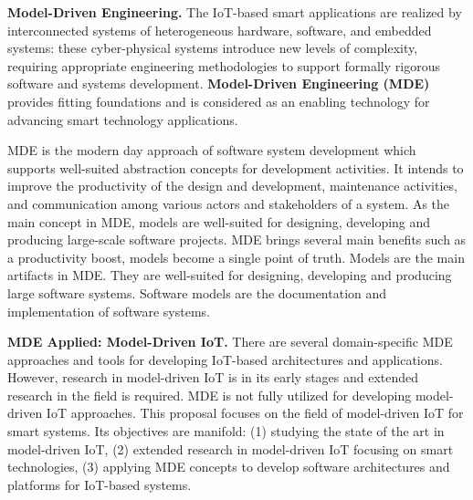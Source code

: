 \documentclass[10pt, oneside]{article}
\begin{document}
\textbf{Model-Driven Engineering.} The IoT-based smart applications are realized by interconnected systems of heterogeneous hardware, software, and embedded systems: these cyber-physical systems introduce new levels of complexity, requiring appropriate engineering methodologies to support formally rigorous software and systems development. \textbf{Model-Driven Engineering (MDE)} provides fitting foundations and is considered as an enabling technology for advancing smart technology applications.

MDE is the modern day approach of software system development which supports well-suited abstraction concepts for development activities. It intends to improve the productivity of the design and development, maintenance activities, and communication among various actors and stakeholders of a system. As the main concept in MDE, models are well-suited for designing, developing and producing large-scale software projects. MDE brings several main benefits such as a productivity boost, models become a single point of truth. Models are the main artifacts in MDE. They are well-suited for designing, developing and producing large software systems. Software models are the documentation and implementation of software systems.

\textbf{MDE Applied: Model-Driven IoT.} There are several domain-specific MDE approaches and tools for developing IoT-based architectures and applications. However, research in model-driven IoT is in its early stages and extended research in the field is required. MDE is not fully utilized for developing model-driven IoT approaches. This proposal focuses on the field of model-driven IoT for smart systems. Its objectives are manifold: (1) studying the state of the art in model-driven IoT, (2) extended research in model-driven IoT focusing on smart technologies, (3) applying MDE concepts to develop software architectures and platforms for IoT-based systems.
\end{document}
